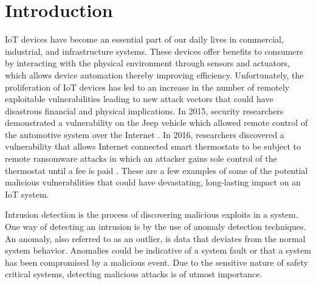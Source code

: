 \section{Introduction}

IoT devices have become an essential part of our daily lives in commercial, industrial, and infrastructure systems. These devices offer benefits to consumers by interacting with the physical environment through sensors and actuators, which allows device automation thereby improving efficiency. Unfortunately, the proliferation of IoT devices has led to an increase in the number of remotely exploitable vulnerabilities leading to new attack vectors that could have disastrous financial and physical implications. In 2015, security researchers demonstrated a vulnerability on the Jeep vehicle which allowed remote control of the automotive system over the Internet \cite{jeep_vulnerabilty}. In 2016, researchers discovered a vulnerability that allows Internet connected smart thermostats to be subject to remote ransomware attacks in which an attacker gains sole control of the thermostat until a fee is paid \cite{smart_thermostat}. These are a few examples of some of the potential malicious vulnerabilities that could have devastating, long-lasting impact on an IoT system. \par Intrusion detection \cite{Lazarevic2005} is the process of discovering malicious exploits in a system. One way of detecting an intrusion is by the use of anomaly detection techniques. An anomaly, also referred to as an outlier, is data that deviates from the normal system behavior. Anomalies could be indicative of a system fault or that a system has been compromised by a malicious event. Due to the sensitive nature of safety critical systems, detecting malicious attacks is of utmost importance.

 



